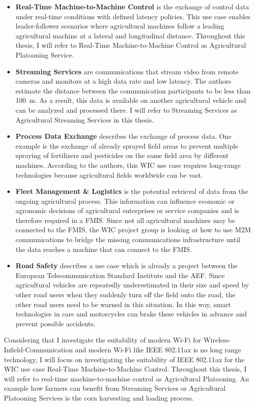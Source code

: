 \begin{itemize}
	\item \textbf{Real-Time Machine-to-Machine Control} is the exchange of control data under real-time conditions with defined latency policies. This use case enables leader-follower scenarios where agricultural machines follow a leading agricultural machine at a lateral and longitudinal distance. Throughout this thesis, I will refer to Real-Time Machine-to-Machine Control as Agricultural Platooning Service.
	\item \textbf{Streaming Services} are communications that stream video from remote cameras and monitors at a high data rate and low latency. The authors estimate the distance between the communication participants to be less than \SI{100}{\metre}. As a result, this data is available on another agricultural vehicle and can be analyzed and processed there.
	I will refer to Streaming Services as Agricultural Streaming Services in this thesis.
	\item \textbf{Process Data Exchange} describes the exchange of process data. One example is the exchange of already sprayed field areas to prevent multiple spraying of fertilizers and pesticides on the same field area by different machines. According to the authors, this \ac{WIC} use case requires long-range technologies because agricultural fields worldwide can be vast.
	\item \textbf{Fleet Management \& Logistics} is the potential retrieval of data from the ongoing agricultural process. This information can influence economic or agronomic decisions of agricultural enterprises or service companies and is therefore required in a \ac{FMIS}.
	Since not all agricultural machines may be connected to the \ac{FMIS}, the \ac{WIC} project group is looking at how to use \ac{M2M} communications to bridge the missing communications infrastructure until the data reaches a machine that can connect to the \ac{FMIS}.
	\item \textbf{Road Safety} describes a use case which is already a project between the European Telecommunication Standard Institute and the \ac{AEF}. Since agricultural vehicles are repeatedly underestimated in their size and speed by other road users when they suddenly turn off the field onto the road, the other road users need to be warned in this situation. In this way, smart technologies in cars and motorcycles can brake these vehicles in advance and prevent possible accidents.
\end{itemize}

Considering that I investigate the suitability of modern Wi-Fi for Wireless-Infield-Communication and modern Wi-Fi like IEEE 802.11ax is no long range technology,
I will focus on investigating the suitability of IEEE 802.11ax for the \ac{WIC} use case Real-Time Machine-to-Machine Control.
Throughout this thesis, I will refer to real-time machine-to-machine control as Agricultural Platooning.
An example how farmers can benefit from Streaming Services or Agricultural Platooning Services is the corn harvesting and loading process.
